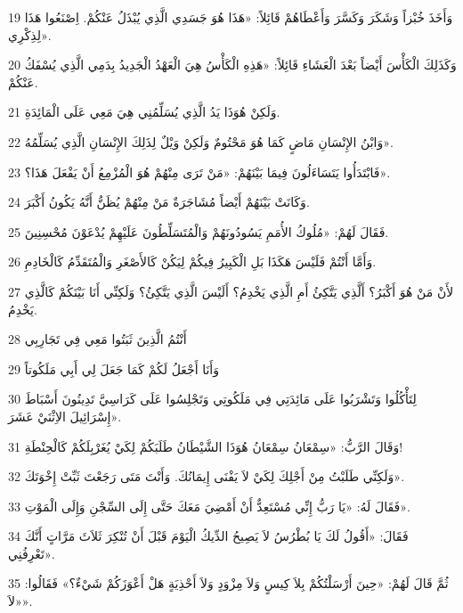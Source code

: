 \par 19 وَأَخَذَ خُبْزاً وَشَكَرَ وَكَسَّرَ وَأَعْطَاهُمْ قَائِلاً: «هَذَا هُوَ جَسَدِي الَّذِي يُبْذَلُ عَنْكُمْ. اِصْنَعُوا هَذَا لِذِكْرِي».
\par 20 وَكَذَلِكَ الْكَأْسَ أَيْضاً بَعْدَ الْعَشَاءِ قَائِلاً: «هَذِهِ الْكَأْسُ هِيَ الْعَهْدُ الْجَدِيدُ بِدَمِي الَّذِي يُسْفَكُ عَنْكُمْ.
\par 21 وَلَكِنْ هُوَذَا يَدُ الَّذِي يُسَلِّمُنِي هِيَ مَعِي عَلَى الْمَائِدَةِ.
\par 22 وَابْنُ الإِنْسَانِ مَاضٍ كَمَا هُوَ مَحْتُومٌ وَلَكِنْ وَيْلٌ لِذَلِكَ الإِنْسَانِ الَّذِي يُسَلِّمُهُ».
\par 23 فَابْتَدَأُوا يَتَسَاءَلُونَ فِيمَا بَيْنَهُمْ: «مَنْ تَرَى مِنْهُمْ هُوَ الْمُزْمِعُ أَنْ يَفْعَلَ هَذَا؟».
\par 24 وَكَانَتْ بَيْنَهُمْ أَيْضاً مُشَاجَرَةٌ مَنْ مِنْهُمْ يُظَنُّ أَنَّهُ يَكُونُ أَكْبَرَ.
\par 25 فَقَالَ لَهُمْ: «مُلُوكُ الأُمَمِ يَسُودُونَهُمْ وَالْمُتَسَلِّطُونَ عَلَيْهِمْ يُدْعَوْنَ مُحْسِنِينَ.
\par 26 وَأَمَّا أَنْتُمْ فَلَيْسَ هَكَذَا بَلِ الْكَبِيرُ فِيكُمْ لِيَكُنْ كَالأَصْغَرِ وَالْمُتَقَدِّمُ كَالْخَادِمِ.
\par 27 لأَنْ مَنْ هُوَ أَكْبَرُ؟ أَلَّذِي يَتَّكِئُ أَمِ الَّذِي يَخْدِمُ؟ أَلَيْسَ الَّذِي يَتَّكِئُ؟ وَلَكِنِّي أَنَا بَيْنَكُمْ كَالَّذِي يَخْدِمُ.
\par 28 أَنْتُمُ الَّذِينَ ثَبَتُوا مَعِي فِي تَجَارِبِي
\par 29 وَأَنَا أَجْعَلُ لَكُمْ كَمَا جَعَلَ لِي أَبِي مَلَكُوتاً
\par 30 لِتَأْكُلُوا وَتَشْرَبُوا عَلَى مَائِدَتِي فِي مَلَكُوتِي وَتَجْلِسُوا عَلَى كَرَاسِيَّ تَدِينُونَ أَسْبَاطَ إِسْرَائِيلَ الاِثْنَيْ عَشَرَ».
\par 31 وَقَالَ الرَّبُّ: «سِمْعَانُ سِمْعَانُ هُوَذَا الشَّيْطَانُ طَلَبَكُمْ لِكَيْ يُغَرْبِلَكُمْ كَالْحِنْطَةِ!
\par 32 وَلَكِنِّي طَلَبْتُ مِنْ أَجْلِكَ لِكَيْ لاَ يَفْنَى إِيمَانُكَ. وَأَنْتَ مَتَى رَجَعْتَ ثَبِّتْ إِخْوَتَكَ».
\par 33 فَقَالَ لَهُ: «يَا رَبُّ إِنِّي مُسْتَعِدٌّ أَنْ أَمْضِيَ مَعَكَ حَتَّى إِلَى السِّجْنِ وَإِلَى الْمَوْتِ».
\par 34 فَقَالَ: «أَقُولُ لَكَ يَا بُطْرُسُ لاَ يَصِيحُ الدِّيكُ الْيَوْمَ قَبْلَ أَنْ تُنْكِرَ ثَلاَثَ مَرَّاتٍ أَنَّكَ تَعْرِفُنِي».
\par 35 ثُمَّ قَالَ لَهُمْ: «حِينَ أَرْسَلْتُكُمْ بِلاَ كِيسٍ وَلاَ مِزْوَدٍ وَلاَ أَحْذِيَةٍ هَلْ أَعْوَزَكُمْ شَيْءٌ؟» فَقَالُوا: «لاَ».
